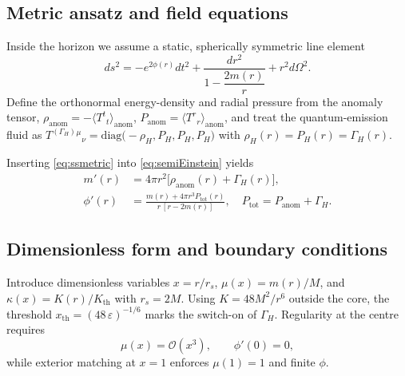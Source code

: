 \subsection{Metric ansatz and field equations}
\label{sec:ansatz}

Inside the horizon we assume a static, spherically symmetric line element
\begin{equation}
  ds^{2}
  =-e^{2\phi(r)}dt^{2}
   +\frac{dr^{2}}{1-\dfrac{2m(r)}{r}}
   +r^{2}d\Omega^{2}.
  \label{eq:ssmetric}
\end{equation}
Define the orthonormal energy-density and radial pressure from the anomaly
tensor,
$\rho_{\text{anom}}=-\langle T^{t}{}_{t}\rangle_{\text{anom}}$,
$P_{\text{anom}}=\langle T^{r}{}_{r}\rangle_{\text{anom}}$,
and treat the quantum-emission fluid as
$T^{(\Gamma_H)}{}^{\mu}{}_{\nu}
  =\mathrm{diag}\!\bigl(-\rho_H,P_H,P_H,P_H\bigr)$
with
$\rho_H(r)=P_H(r)=\Gamma_H(r)$.

Inserting \eqref{eq:ssmetric} into \eqref{eq:semiEinstein} yields
\begin{subequations}\label{eq:EinsteinODEs}
\begin{align}
  m'(r)
  &=4\pi r^{2}\bigl[\rho_{\text{anom}}(r)+\Gamma_H(r)\bigr],
  \label{eq:mprime}\\
  \phi'(r)
  &=\frac{m(r)+4\pi r^{3}P_{\text{tot}}(r)}
        {r\,[r-2m(r)]},
  \quad
  P_{\text{tot}}=P_{\text{anom}}+\Gamma_H .
  \label{eq:phiprime}
\end{align}
\end{subequations}

\subsection{Dimensionless form and boundary conditions}
\label{sec:dimless}

Introduce dimensionless variables
$x=r/r_s$, $\mu(x)=m(r)/M$, and
$\kappa(x)=K(r)/K_{\mathrm{th}}$ with $r_s=2M$.
Using $K=48M^{2}/r^{6}$ outside the core, the threshold
$x_{\mathrm{th}}=(48\,\varepsilon)^{-1/6}$ marks the switch-on of
$\Gamma_H$.
Regularity at the centre requires
\begin{equation}
  \mu(x)=\mathcal{O}(x^{3}),\qquad
  \phi'(0)=0,
\end{equation}
while exterior matching at $x=1$ enforces
$\mu(1)=1$ and finite $\phi$.


